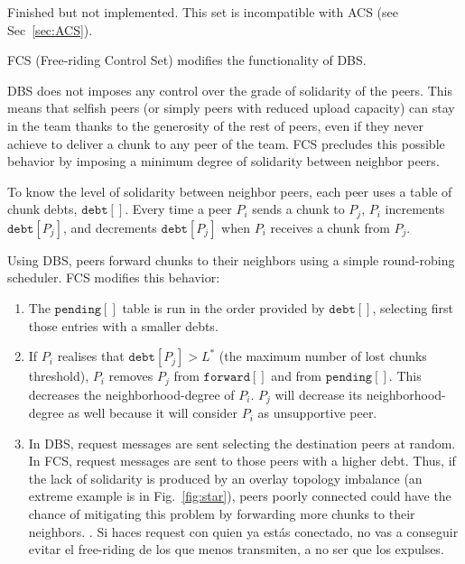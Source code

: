 
\label{sec:FCS}


\begin{notex}
  Finished but not implemented. This set is incompatible with ACS (see Sec~\ref{sec:ACS}).
\end{notex}

FCS (Free-riding Control Set) modifies the functionality of DBS.

DBS does not imposes any control over the grade of solidarity of the
peers. This means that selfish peers (or simply peers with reduced
upload capacity) can stay in the team thanks to the generosity of the
rest of peers, even if they never achieve to deliver a chunk to any
peer of the team. FCS precludes this possible behavior
by imposing a minimum degree of solidarity between neighbor peers.

To know the level of solidarity between neighbor peers, each peer uses
a table of chunk debts, $\mathtt{debt}[]$. Every time a peer $P_i$
sends a chunk to $P_j$, $P_i$ increments $\mathtt{debt}[P_j]$, and
decrements $\mathtt{debt}[P_j]$ when $P_i$ receives a chunk from
$P_j$. 

Using DBS, peers forward chunks to their neighbors using a simple
round-robing scheduler. FCS modifies this behavior:
\begin{enumerate}
\item The $\mathtt{pending}[]$ table is run in the order provided by
  $\mathtt{debt}[]$, selecting first those entries with a smaller
  debts.
\item If $P_i$ realises that $\mathtt{debt}[P_j]>L^*$ (the maximum
  number of lost chunks threshold), $P_i$ removes $P_j$ from
  $\mathtt{forward}[]$ and from $\mathtt{pending}[]$. This decreases
  the \gls{neighborhood-degree} of $P_i$. $P_j$ will decrease its
  \gls{neighborhood-degree} as well because it will consider $P_i$ as
  unsupportive peer.
\item In DBS, request messages are sent selecting the destination
  peers at random. In FCS, request messages are sent to those peers
  with a higher debt. Thus, if the lack of solidarity is produced by
  an overlay topology imbalance (an extreme example is in
  Fig.~\ref{fig:star}), peers poorly connected could have the chance
  of mitigating this problem by forwarding more chunks to their
  neighbors. . {\color{red} Si haces
    request con quien ya estás conectado, no vas a conseguir evitar el
    free-riding de los que menos transmiten, a no ser que los expulses}.
\end{enumerate}

